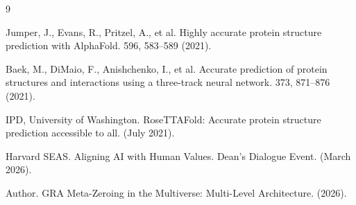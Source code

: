 \documentclass[11pt]{article}
\begin{document}
\begin{thebibliography}{9}

Jumper, J., Evans, R., Pritzel, A., et al.
\newblock Highly accurate protein structure prediction with AlphaFold.
 596, 583--589 (2021).

Baek, M., DiMaio, F., Anishchenko, I., et al.
\newblock Accurate prediction of protein structures and interactions using a three-track neural network.
 373, 871--876 (2021).

IPD, University of Washington.
\newblock RoseTTAFold: Accurate protein structure prediction accessible to all.
 (July 2021).

Harvard SEAS.
\newblock Aligning AI with Human Values. Dean's Dialogue Event.
 (March 2026).

Author.
\newblock GRA Meta-Zeroing in the Multiverse: Multi-Level Architecture.
 (2026).

\end{thebibliography}
\end{document}
